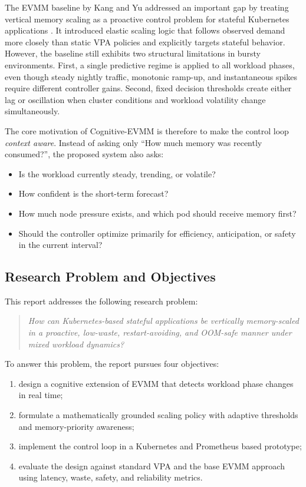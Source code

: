 \documentclass[12pt,a4paper]{article}
\begin{document}
The EVMM baseline by Kang and Yu addressed an important gap by treating vertical memory scaling as a proactive control problem for stateful Kubernetes applications \cite{evmm2025}. It introduced elastic scaling logic that follows observed demand more closely than static VPA policies and explicitly targets stateful behavior. However, the baseline still exhibits two structural limitations in bursty environments. First, a single predictive regime is applied to all workload phases, even though steady nightly traffic, monotonic ramp-up, and instantaneous spikes require different controller gains. Second, fixed decision thresholds create either lag or oscillation when cluster conditions and workload volatility change simultaneously.

The core motivation of Cognitive-EVMM is therefore to make the control loop \emph{context aware}. Instead of asking only ``How much memory was recently consumed?'', the proposed system also asks:
\begin{itemize}
    \item Is the workload currently steady, trending, or volatile?
    \item How confident is the short-term forecast?
    \item How much node pressure exists, and which pod should receive memory first?
    \item Should the controller optimize primarily for efficiency, anticipation, or safety in the current interval?
\end{itemize}

\subsection{Research Problem and Objectives}

This report addresses the following research problem:
\begin{quote}
\emph{How can Kubernetes-based stateful applications be vertically memory-scaled in a proactive, low-waste, restart-avoiding, and OOM-safe manner under mixed workload dynamics?}
\end{quote}

To answer this problem, the report pursues four objectives:
\begin{enumerate}[label=\arabic*)]
    \item design a cognitive extension of EVMM that detects workload phase changes in real time;
    \item formulate a mathematically grounded scaling policy with adaptive thresholds and memory-priority awareness;
    \item implement the control loop in a Kubernetes and Prometheus based prototype;
    \item evaluate the design against standard VPA and the base EVMM approach using latency, waste, safety, and reliability metrics.
\end{enumerate}
\end{document}
